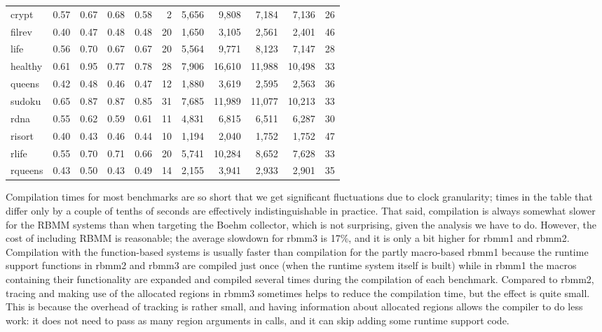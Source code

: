 \documentclass{tlp}
\begin{document}
\begin{table}[ht]
\begin{tabular}{l|*{4}{r|}r||*{5}{r|}}
    crypt    & 0.57 & 0.67 & 0.68 & 0.58 &  2 &  5,656 &  9,808 &  7,184 &  7,136 & 26 \\
    filrev   & 0.40 & 0.47 & 0.48 & 0.48 & 20 &  1,650 &  3,105 &  2,561 &  2,401 & 46 \\
    life     & 0.56 & 0.70 & 0.67 & 0.67 & 20 &  5,564 &  9,771 &  8,123 &  7,147 & 28 \\
    healthy  & 0.61 & 0.95 & 0.77 & 0.78 & 28 &  7,906 & 16,610 & 11,988 & 10,498 & 33 \\
    queens   & 0.42 & 0.48 & 0.46 & 0.47 & 12 &  1,880 &  3,619 &  2,595 &  2,563 & 36 \\
    sudoku   & 0.65 & 0.87 & 0.87 & 0.85 & 31 &  7,685 & 11,989 & 11,077 & 10,213 & 33 \\
    \hline
    rdna     & 0.55 & 0.62 & 0.59 & 0.61 & 11 &  4,831 &  6,815 &  6,511 &  6,287 & 30 \\
    risort   & 0.40 & 0.43 & 0.46 & 0.44 & 10 &  1,194 &  2,040 &  1,752 &  1,752 & 47 \\
    rlife    & 0.55 & 0.70 & 0.71 & 0.66 & 20 &  5,741 & 10,284 &  8,652 &  7,628 & 33 \\
    rqueens  & 0.43 & 0.50 & 0.43 & 0.49 & 14 &  2,155 &  3,941 &  2,933 &  2,901 & 35 \\
    \hline
    \hline
  \end{tabular}
  \normalsize
  \label{table:experiment:ct_os}
\end{table}

Compilation times for most benchmarks
are so short that we get significant fluctuations due to clock granularity;
times in the table that differ only by a couple of tenths of seconds
are effectively indistinguishable in practice.
That said,
compilation is always somewhat slower for the RBMM systems
than when targeting the Boehm collector,
which is not surprising, given the analysis we have to do.
However, the cost of including RBMM is reasonable;
the average slowdown for rbmm3 is 17\%,
and it is only a bit higher for rbmm1 and rbmm2.
Compilation with the function-based systems
is usually faster than compilation for the partly macro-based rbmm1
because the runtime support functions in rbmm2 and rbmm3
are compiled just once (when the runtime system itself is built)
while in rbmm1 the macros containing their functionality
are expanded and compiled several times
during the compilation of each benchmark.
Compared to rbmm2,
tracing and making use of the allocated regions in rbmm3
sometimes helps to reduce the compilation time,
but the effect is quite small.
This is because the overhead of tracking is rather small,
and having information about allocated regions
allows the compiler to do less work:
it does not need to pass as many region arguments in calls,
and it can skip adding some runtime support code.
\end{document}
